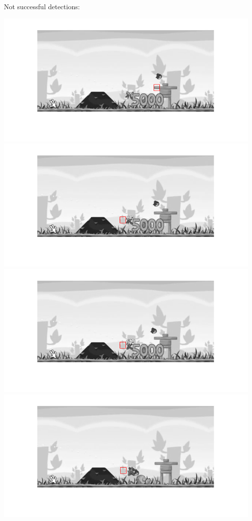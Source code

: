 \documentclass[a4paper]{iacas}
\begin{document}
Not successful detections:

\vskip 0.1in
\begin{minipage}{0.5\textwidth}
\centering
	\includegraphics[scale=0.8]{output/q4/algo_1/13.png}
	\includegraphics[scale=0.8]{output/q4/algo_1/18.png}
	\includegraphics[scale=0.8]{output/q4/algo_1/19.png}
	\includegraphics[scale=0.8]{output/q4/algo_1/20.png}
\end{minipage}
\vskip 0.1in
\end{document}

